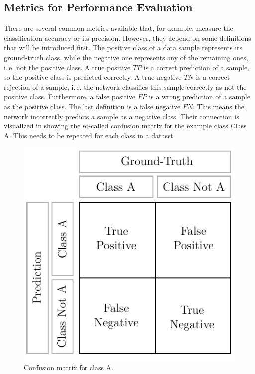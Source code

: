 \subsection{Metrics for Performance Evaluation}
\label{sec:neural-networks-metrics}
There are several common metrics available that, for example, measure the classification accuracy or its precision.
However, they depend on some definitions that will be introduced first.
The positive class of a data sample represents its ground-truth class, while the negative one represents any of the remaining ones, i.\,e. not the positive class.
A true positive $TP$ is a correct prediction of a sample, so the positive class is predicted correctly.
A true negative $TN$ is a correct rejection of a sample, i.\,e. the network classifies this sample correctly as not the positive class.
Furthermore, a false positive $FP$ is a wrong prediction of a sample as the positive class.
The last definition is a false negative $FN$.
This means the network incorrectly predicts a sample as a negative class.
Their connection is visualized in  showing the so-called confusion matrix \cite{Fawcett:2006:IRA:1159473.1159475} for the example class Class A.
This needs to be repeated for each class in a dataset.
\begin{figure}
	\centering
	\includegraphics[]{images/confusion_matrix.pdf}
	\caption[Confusion matrix]{Confusion matrix for class A.}
	\label{fig:confusion-matrix}
\end{figure}
